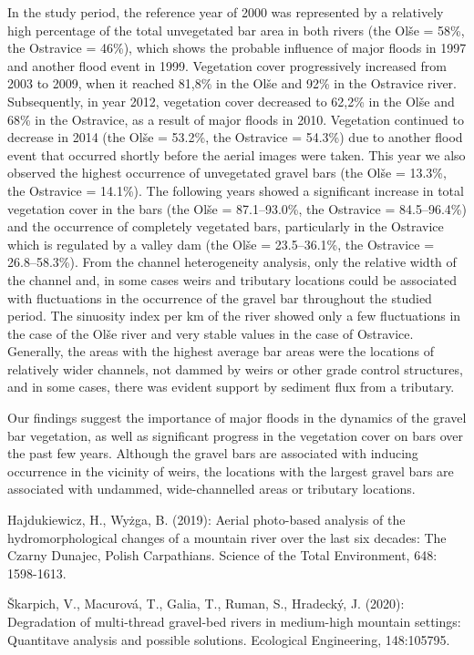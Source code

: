 {In the study period, the reference year of 2000 was represented by a relatively high percentage of the total unvegetated bar area in both rivers (the Olše = 58\%, the Ostravice = 46\%), which shows the probable influence of major floods in 1997 and another flood event in 1999. Vegetation cover progressively increased from 2003 to 2009, when it reached 81,8\% in the Olše and 92\% in the Ostravice river. Subsequently, in year 2012, vegetation cover decreased to 62,2\% in the Olše and 68\% in the Ostravice, as a result of major floods in 2010. Vegetation continued to decrease in 2014 (the Olše = 53.2\%, the Ostravice = 54.3\%) due to another flood event that occurred shortly before the aerial images were taken. This year we also observed the highest occurrence of unvegetated gravel bars (the Olše = 13.3\%, the Ostravice = 14.1\%). The following years showed a significant increase in total vegetation cover in the bars (the Olše = 87.1--93.0\%, the Ostravice = 84.5--96.4\%) and the occurrence of completely vegetated bars, particularly in the Ostravice which is regulated by a valley dam (the Olše = 23.5--36.1\%, the Ostravice = 26.8--58.3\%). From the channel heterogeneity analysis, only the relative width of the channel and, in some cases weirs and tributary locations could be associated with fluctuations in the occurrence of the gravel bar throughout the studied period. The sinuosity index per km of the river showed only a few fluctuations in the case of the Olše river and very stable values in the case of Ostravice. Generally, the areas with the highest average bar areas were the locations of relatively wider channels, not dammed by weirs or other grade control structures, and in some cases, there was evident support by sediment flux from a tributary.

Our findings suggest the importance of major floods in the dynamics of the gravel bar vegetation, as well as significant progress in the vegetation cover on bars over the past few years. Although the gravel bars are associated with inducing occurrence in the vicinity of weirs, the locations with the largest gravel bars are associated with undammed, wide-channelled areas or tributary locations.
}
{Hajdukiewicz, H., Wyżga, B. (2019): Aerial photo-based analysis of the hydromorphological changes of a mountain river over the last six decades: The Czarny Dunajec, Polish Carpathians. Science of the Total Environment, 648: 1598-1613.

Škarpich, V., Macurová, T., Galia, T., Ruman, S., Hradecký, J. (2020): Degradation of multi-thread gravel-bed rivers in medium-high mountain settings: Quantitave analysis and possible solutions. Ecological Engineering, 148:105795.

}

